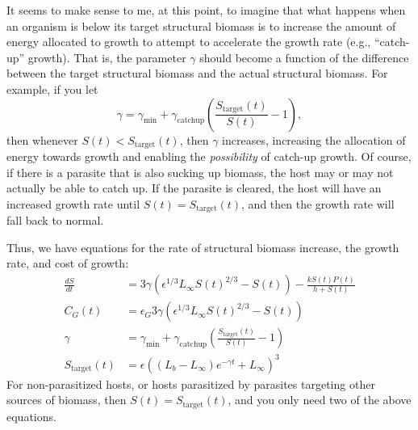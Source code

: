 \documentclass[11pt,reqno,final,pdftex]{amsart}\usepackage[]{graphicx}\usepackage[]{color}
\theoremstyle{plain}
\numberwithin{equation}{part}
\begin{document}
It seems to make sense to me, at this point, to imagine that what happens when an organism is below its target structural biomass is to increase the amount of energy allocated to growth to attempt to accelerate the growth rate (e.g., ``catch-up'' growth).
That is, the parameter $\gamma$ should become a function of the difference between the target structural biomass and the actual structural biomass.
For example, if you let
\begin{equation}
\gamma =\gamma _{\min }+\gamma _{\text{catchup}}\left(\frac{S_{\text{target}}(t)}{S(t)}-1\right),
\end{equation}
then whenever $S(t)<S_{\text{target}}(t)$, then $\gamma$ increases, increasing the allocation of energy towards growth and enabling the \textit{possibility} of catch-up growth.
Of course, if there is a parasite that is also sucking up biomass, the host may or may not actually be able to catch up.
If the parasite is cleared, the host will have an increased growth rate until $S(t)=S_{\text{target}}(t)$, and then the growth rate will fall back to normal.

Thus, we have equations for the rate of structural biomass increase, the growth rate, and cost of growth:
\begin{align}
\frac{dS}{dt} &= 3\gamma  \left(\epsilon ^{1/3}L_{\infty }S(t)^{2/3}-S(t)\right)-\frac{k S(t) P(t)}{h+S(t)} \\
C_G(t)&=\epsilon _G 3\gamma  \left(\epsilon ^{1/3}L_{\infty }S(t)^{2/3}-S(t)\right) \\
\gamma &=\gamma _{\min }+\gamma _{\text{catchup}}\left(\frac{S_{\text{target}}(t)}{S(t)}-1\right) \\
S_{\text{target}}(t) &=\epsilon  \left(\left(L_b-L_{\infty }\right) e^{-\gamma  t}+L_{\infty }\right)^3
\end{align}
For non-parasitized hosts, or hosts parasitized by parasites targeting other sources of biomass, then $S(t)=S_{\text{target}}(t)$, and you only need two of the above equations.



\end{document}
